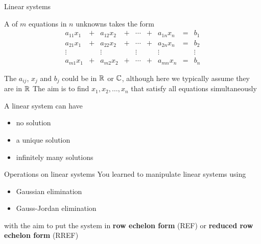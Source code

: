 \documentclass[aspectratio=169]{beamer}\usepackage[]{graphicx}\usepackage[]{xcolor}
\begin{document}
\begin{frame}{Linear systems}
\begin{definition}
	A  of $m$ equations in $n$ unknowns takes the form
	\begin{equation}\label{sys:linear_system}
	\begin{matrix}
	a_{11}x_1 &+& a_{12}x_2 &+& \cdots &+& a_{1n}x_n &=& b_1 \\
	a_{21}x_1 &+& a_{22}x_2 &+& \cdots &+& a_{2n}x_n &=& b_2 \\
	\vdots && \vdots && \vdots && \vdots && \vdots \\
	a_{m1}x_1 &+& a_{m2}x_2 &+& \cdots &+& a_{mn}x_n &=& b_n
	\end{matrix}
	\end{equation}
\end{definition}
The $a_{ij}$, $x_j$ and $b_j$ could be in $\mathbb{R}$ or $\mathbb{C}$, although here we typically assume they are in $\mathbb{R}$
\vfill
The aim is to find $x_1,x_2,\ldots,x_n$ that satisfy all equations simultaneously
\end{frame}

\begin{frame}
\begin{importanttheorem}
\label{th:nature_solutions_linear_system}
A linear system can have
\begin{itemize}
	\item no solution
	\item a unique solution
	\item infinitely many solutions
\end{itemize}
\end{importanttheorem}
\end{frame}


\begin{frame}{Operations on linear systems}
You learned to manipulate linear systems using
\begin{itemize}
	\item Gaussian elimination
	\item Gauss-Jordan elimination
\end{itemize}
with the aim to put the system in \textbf{row echelon form} (REF) or \textbf{reduced row echelon form} (RREF) 
\end{frame}
\end{document}
